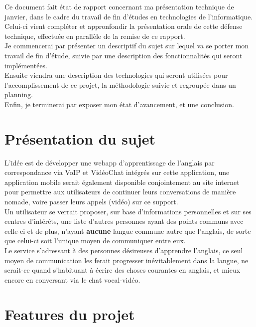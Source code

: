 \documentclass{report}
\begin{document}
	Ce document fait état de rapport concernant ma présentation technique de janvier, dans le cadre du travail de fin d'études en technologies de l'informatique.\\

	Celui-ci vient compléter et appronfondir la présentation orale de cette défense technique, effectuée en parallèle de la remise de ce rapport.\\

	Je commencerai par présenter un descriptif du sujet sur lequel va se porter mon travail de fin d'étude, suivie par une description des fonctionnalités qui seront implémentées.\\
	Ensuite viendra une description des technologies qui seront utilisées pour l'accomplissement de ce projet, la méthodologie suivie et regroupée dans un planning.\\
	Enfin, je terminerai par exposer mon état d'avancement, et une conclusion.\\


\section{Présentation du sujet}

	L'idée est de développer une webapp d'apprentissage de l'anglais par correspondance via VoIP et VidéoChat intégrés sur cette application, une application mobile serait également disponible conjointement au site internet pour permettre aux utilisateurs de continuer leurs conversations de manière nomade, voire passer leurs appels (vidéo) sur ce support.\\

	Un utilisateur se verrait proposer, sur base d'informations personnelles et sur ses centres d'intérêts, une liste d'autres personnes ayant des points communs avec celle-ci et de plus, n'ayant \textbf{aucune} langue commune autre que l'anglais, de sorte que celui-ci soit l'unique moyen de communiquer entre eux.\\
	Le service s'adressant à des personnes désireuses d'apprendre l'anglais, ce seul moyen de communication les ferait progresser inévitablement dans la langue, ne serait-ce quand s'habituant à écrire des choses courantes en anglais, et mieux encore en conversant via le chat vocal-vidéo.\\

\section{Features du projet}
\end{document}
